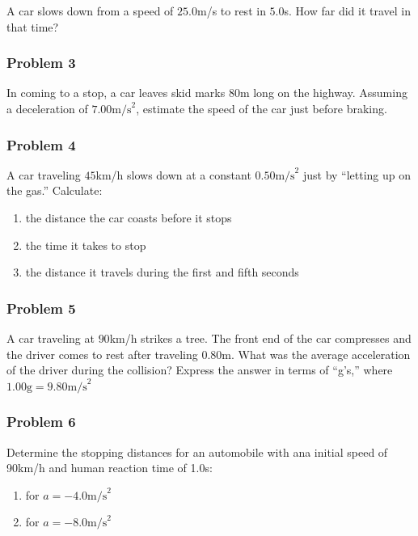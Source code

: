 \documentclass[
  letterpaper,
  DIV=11,
  numbers=noendperiod]{scrartcl}
\providecommand{\tightlist}{%
  \setlength{\itemsep}{0pt}\setlength{\parskip}{0pt}}\usepackage{longtable,booktabs,array}
\begin{document}
A car slows down from a speed of \(25.0\)m/s to rest in \(5.0\)s. How
far did it travel in that time?

\hypertarget{problem-3-1}{%
\subsubsection{Problem 3}\label{problem-3-1}}

In coming to a stop, a car leaves skid marks 80m long on the highway.
Assuming a deceleration of \(7.00 \text{m/s}^2\), estimate the speed of
the car just before braking.

\hypertarget{problem-4-1}{%
\subsubsection{Problem 4}\label{problem-4-1}}

A car traveling \(45\)km/h slows down at a constant
\(0.50 \text{m/s}^2\) just by ``letting up on the gas.'' Calculate:

\begin{enumerate}
\def\labelenumi{(\alph{enumi})}
\tightlist
\item
  the distance the car coasts before it stops
\item
  the time it takes to stop
\item
  the distance it travels during the first and fifth seconds
\end{enumerate}

\hypertarget{problem-5}{%
\subsubsection{Problem 5}\label{problem-5}}

A car traveling at \(90\)km/h strikes a tree. The front end of the car
compresses and the driver comes to rest after traveling \(0.80\)m. What
was the average acceleration of the driver during the collision? Express
the answer in terms of ``g's,'' where
\(1.00\text{g} = 9.80 \text{m/s}^2\)

\hypertarget{problem-6}{%
\subsubsection{Problem 6}\label{problem-6}}

Determine the stopping distances for an automobile with ana initial
speed of 90km/h and human reaction time of 1.0s:

\begin{enumerate}
\def\labelenumi{(\alph{enumi})}
\tightlist
\item
  for \(a =-4.0 \text{m/s}^2\)
\item
  for \(a = -8.0 \text{m/s}^2\)
\end{enumerate}
\end{document}
